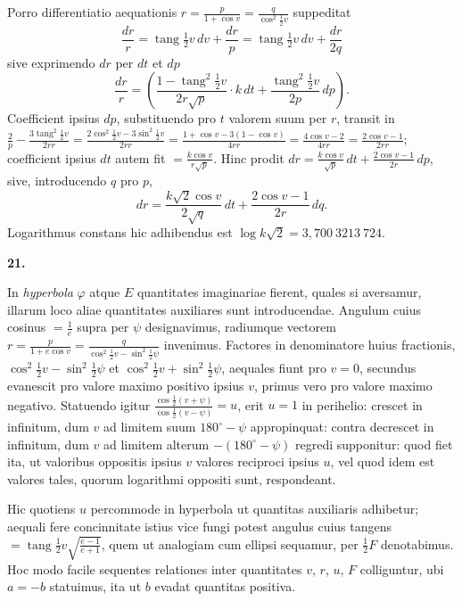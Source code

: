 \documentclass[12pt,a4paper]{book}
\newcommand{\tang}{\operatorname{tang}}
\begin{document}
Porro differentiatio aequationis $r=\frac{p}{1+\cos v}=\frac{q}{\cos^{2}\tfrac{1}{2}v}$ suppeditat
\[
\frac{dr}{r}=\tang\tfrac{1}{2}v\,dv+\frac{dr}{p}=\tang\tfrac{1}{2}v\,dv+\frac{dr}{2q}
\]
sive exprimendo $dr$ per $dt$ et $dp$
\[
\frac{dr}{r}=\left(\frac{1-\tang^{2}\tfrac{1}{2}v}{2r\sqrt{p}}\cdot k\,dt+\frac{\tang^{2}\tfrac{1}{2}v}{2p}\,dp\right).
\]
Coefficient ipsius $dp$, substituendo pro $t$ valorem suum per $r$, transit in $\frac{2}{p}-\frac{3\tang^{2}\tfrac{1}{2}v}{2rr}=\frac{2\cos^{2}\tfrac{1}{2}v-3\sin^{2}\tfrac{1}{2}v}{2rr}=\frac{1+\cos v-3(1-\cos v)}{4rr}=\frac{4\cos v-2}{4rr}=\frac{2\cos v-1}{2rr}$; coefficient ipsius $dt$ autem fit $=\frac{k\cos v}{r\sqrt{p}}$. Hinc prodit $dr=\frac{k\cos v}{\sqrt{p}}\,dt+\frac{2\cos v-1}{2r}\,dp$, sive, introducendo $q$ pro $p$,
\[
dr=\frac{k\sqrt{2}\cos v}{2\sqrt{q}}\,dt+\frac{2\cos v-1}{2r}\,dq.
\]
Logarithmus constans hic adhibendus est $\log k\sqrt{2}=3{,}700\ 3213\ 724$.

\textbf{21.}

In \textit{hyperbola} $\varphi$ atque $E$ quantitates imaginariae fierent, quales si aversamur, illarum loco aliae quantitates auxiliares sunt introducendae. Angulum cuius cosinus $=\frac{1}{e}$ supra per $\psi$ designavimus, radiumque vectorem $r=\frac{p}{1+e\cos v}=\frac{q}{\cos^{2}\tfrac{1}{2}v-\sin^{2}\tfrac{1}{2}\psi}$ invenimus. Factores in denominatore huius fractionis, $\cos^{2}\tfrac{1}{2}v-\sin^{2}\tfrac{1}{2}\psi$ et $\cos^{2}\tfrac{1}{2}v+\sin^{2}\tfrac{1}{2}\psi$, aequales fiunt pro $v=0$, secundus evanescit pro valore maximo positivo ipsius $v$, primus vero pro valore maximo negativo. Statuendo igitur $\frac{\cos\tfrac{1}{2}(v+\psi)}{\cos\tfrac{1}{2}(v-\psi)}=u$, erit $u=1$ in perihelio: crescet in infinitum, dum $v$ ad limitem suum $180^{\circ}-\psi$ appropinquat: contra decrescet in infinitum, dum $v$ ad limitem alterum $-(180^{\circ}-\psi)$ regredi supponitur: quod fiet ita, ut valoribus oppositis ipsius $v$ valores reciproci ipsius $u$, vel quod idem est valores tales, quorum logarithmi oppositi sunt, respondeant.

Hic quotiens $u$ percommode in hyperbola ut quantitas auxiliaris adhibetur; aequali fere concinnitate istius vice fungi potest angulus cuius tangens $=\tang\tfrac{1}{2}v\sqrt{\frac{e-1}{e+1}}$, quem ut analogiam cum ellipsi sequamur, per $\tfrac{1}{2}F$ denotabimus. Hoc modo facile sequentes relationes inter quantitates $v$, $r$, $u$, $F$ colliguntur, ubi $a=-b$ statuimus, ita ut $b$ evadat quantitas positiva.
\end{document}
